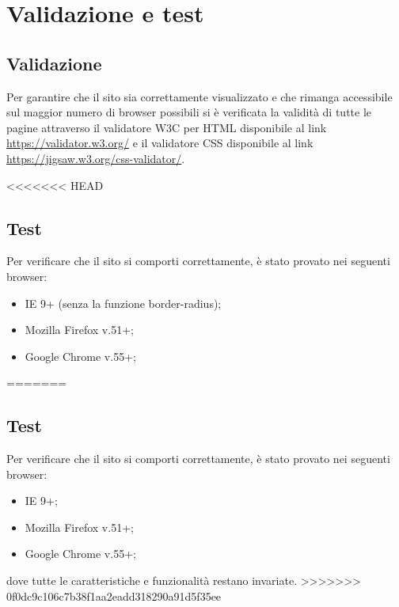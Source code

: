 \section{Validazione e test}
\subsection{Validazione}
Per garantire che il sito sia correttamente visualizzato e che rimanga accessibile sul maggior numero di browser possibili si è verificata la validità di tutte le pagine attraverso il validatore W3C per HTML disponibile al link \url{https://validator.w3.org/} e il validatore CSS disponibile al link \url{https://jigsaw.w3.org/css-validator/}.

<<<<<<< HEAD
\subsection{Test} Per verificare che il sito si comporti correttamente, è stato provato nei seguenti browser: 
\begin{itemize} 	
	\item IE 9+ (senza la funzione border-radius); 	
	\item Mozilla Firefox v.51+; 	
	\item Google Chrome v.55+; 
\end{itemize} 
=======
\subsection{Test}
Per verificare che il sito si comporti correttamente, è stato provato nei seguenti browser:
\begin{itemize}
	\item IE 9+;
	\item Mozilla Firefox v.51+;
	\item Google Chrome v.55+;
\end{itemize}
dove tutte le caratteristiche e funzionalità restano invariate.
>>>>>>> 0f0dc9c106c7b38f1aa2eadd318290a91d5f35ee

\newpage